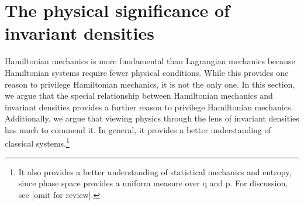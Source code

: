 \documentclass[letterpaper]{article}
\begin{document}
\section{The physical significance of invariant densities}
\label{density}

Hamiltonian mechanics is more fundamental than Lagrangian mechanics because Hamiltonian systems require fewer physical conditions. While this provides one reason to privilege Hamiltonian mechanics, it is not the only one. In this section, we argue that the special relationship between Hamiltonian mechanics and invariant densities provides a further reason to privilege Hamiltonian mechanics. Additionally, we argue that viewing physics through the lens of invariant densities has much to commend it. In general, it provides a better understanding of classical systems.\footnote{It also provides a better understanding of statistical mechanics and entropy, since phase space provides a uniform measure over q and p. For discussion, see \textcites{shpmp} [omit for review].} 
\end{document}
